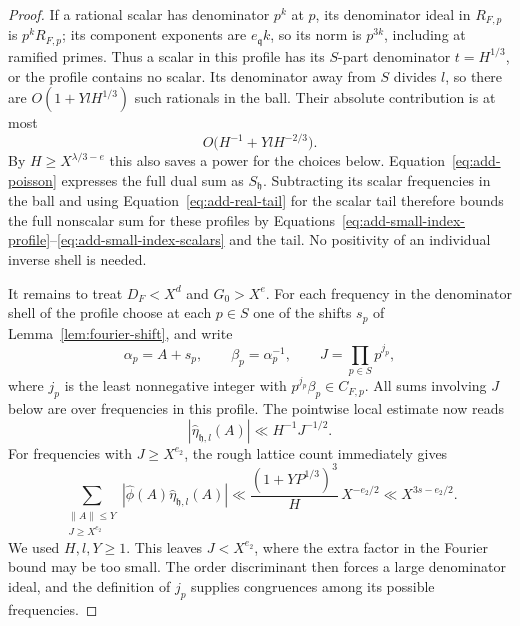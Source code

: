 \begin{proof}
If a rational scalar has denominator \(p^k\) at \(p\), its denominator
ideal in \(R_{F,p}\) is \(p^kR_{F,p}\); its component exponents are
\(e_{\mathfrak q}k\), so its norm is \(p^{3k}\), including at ramified
primes.  Thus a scalar in this profile has its \(S\)-part denominator
\(t=H^{1/3}\), or the profile contains no scalar.  Its denominator away
from \(S\) divides \(l\), so there are
\(O(1+YlH^{1/3})\) such rationals in the ball.  Their absolute contribution
is at most
\begin{equation}
 O\bigl(H^{-1}+YlH^{-2/3}\bigr).
 \label{eq:add-small-index-scalars}
\end{equation}
By \(H\ge X^{\lambda/3-e}\) this also saves a power for the choices below.
Equation~\eqref{eq:add-poisson} expresses the full dual sum as
\(S_{\mathfrak h}\).  Subtracting its scalar frequencies in the ball and
using Equation~\eqref{eq:add-real-tail} for the scalar tail therefore bounds
the full nonscalar sum for these profiles by
Equations~\eqref{eq:add-small-index-profile}--\eqref{eq:add-small-index-scalars}
and the tail.  No positivity of an individual inverse shell is needed.

It remains to treat \(D_F<X^d\) and \(G_0>X^e\).  For each frequency in
the denominator shell of the profile choose at each \(p\in S\) one of the shifts \(s_p\) of
Lemma~\ref{lem:fourier-shift}, and write
\[
 \alpha_p=A+s_p,\qquad \beta_p=\alpha_p^{-1},\qquad
 J=\prod_{p\in S}p^{j_p},
\]
where \(j_p\) is the least nonnegative integer with
\(p^{j_p}\beta_p\in C_{F,p}\).  All sums involving \(J\) below are over
frequencies in this profile.  The pointwise local estimate now reads
\[
 |\widehat\eta_{\mathfrak h,l}(A)|
       \ll H^{-1}J^{-1/2}.
\]
For frequencies with \(J\ge X^{e_2}\), the rough lattice count immediately
gives
\begin{equation}
 \sum_{\substack{\|A\|\le Y\\J\ge X^{e_2}}}
  |\widehat\phi(A)\widehat\eta_{\mathfrak h,l}(A)|
  \ll \frac{(1+YP^{1/3})^3}{H}\,X^{-e_2/2}
  \ll X^{3s-e_2/2}.
 \label{eq:add-large-j}
\end{equation}
We used \(H,l,Y\ge1\).  This leaves \(J<X^{e_2}\), where the extra factor in
the Fourier bound may be too small.  The order discriminant then forces a
large denominator ideal, and the definition of \(j_p\) supplies congruences
among its possible frequencies.


\end{proof}
